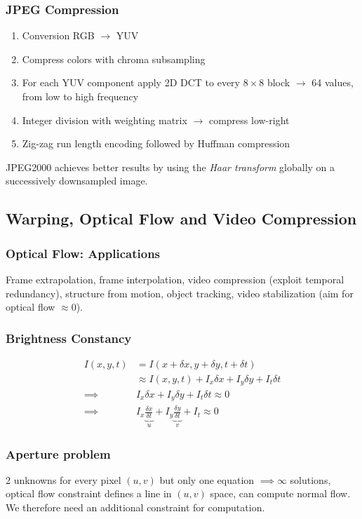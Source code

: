 \documentclass[a4paper,10pt]{article}
\begin{document}
\subsubsection{JPEG Compression}
\begin{enumerate}
    \item Conversion RGB \(\to\) YUV
    \item Compress colors with chroma subsampling
    \item For each YUV component apply 2D DCT to every \(8 \times 8\) block \(\rightarrow\) 64 values, from low to high frequency
    \item Integer division with weighting matrix \(\rightarrow\) compress low-right
    \item Zig-zag run length encoding followed by Huffman compression
\end{enumerate}
JPEG2000 achieves better results by using the \emph{Haar transform} globally on a successively downsampled image.

\subsection{Warping, Optical Flow and Video Compression}
\subsubsection{Optical Flow: Applications}
Frame extrapolation, frame interpolation, video compression (exploit temporal redundancy), structure from motion, object tracking, video stabilization (aim for optical flow \( \approx 0 \)).

\subsubsection{Brightness Constancy}
\begin{align*}
    I(x,y,t) &= I(x+ \delta x, y + \delta y, t + \delta t) \\
	     &\approx I(x,y,t) + I_x \delta x + I_y \delta y + I_t \delta t \tag{Taylor approx., good if small motion}\\
    \implies &I_x \delta x + I_y \delta y + I_t \delta t \approx 0 \\
    \implies &I_x \underbrace{\frac{\delta x}{\delta t}}_u + I_y \underbrace{\frac{\delta y}{\delta t}}_v + I_t \approx 0
\end{align*}

\subsubsection{Aperture problem}
2 unknowns for every pixel \((u,v)\) but only one equation \(\implies \infty\)  solutions, optical flow constraint defines a line in \((u, v)\) space, can compute normal flow. We therefore need an additional constraint for computation.
\end{document}
